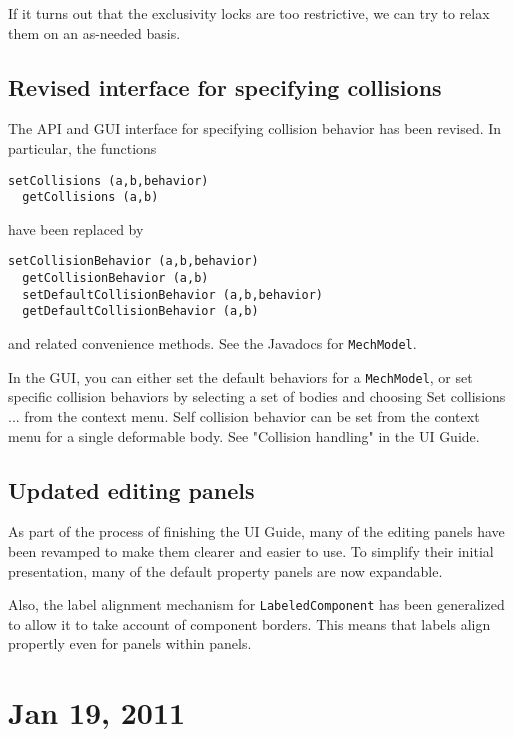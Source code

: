 \documentclass{article}
\begin{document}
If it turns out that the exclusivity locks are too restrictive, we can
try to relax them on an as-needed basis.

\subsection*{Revised interface for specifying collisions}

The API and GUI interface for specifying collision behavior has been
revised. In particular, the functions 

\begin{lstlisting}[]
  setCollisions (a,b,behavior)
  getCollisions (a,b)
\end{lstlisting}

have been replaced by

\begin{lstlisting}[]
  setCollisionBehavior (a,b,behavior)
  getCollisionBehavior (a,b)
  setDefaultCollisionBehavior (a,b,behavior)
  getDefaultCollisionBehavior (a,b)
\end{lstlisting}

and related convenience methods. See the Javadocs for {\tt MechModel}.

In the GUI, you can either set the default behaviors for a {\tt MechModel},
or set specific collision behaviors by selecting a set of
bodies and choosing {\sf Set collisions ...} from the context menu.
Self collision behavior can be set from the context menu for a single
deformable body. See "Collision handling" in the UI Guide.

\subsection*{Updated editing panels}

As part of the process of finishing the UI Guide, many of the editing
panels have been revamped to make them clearer and easier to use. To
simplify their initial presentation, many of the default property
panels are now expandable.

Also, the label alignment mechanism for {\tt LabeledComponent} has been
generalized to allow it to take account of component borders. This
means that labels align propertly even for panels within panels.

\section*{Jan 19, 2011}
\end{document}
